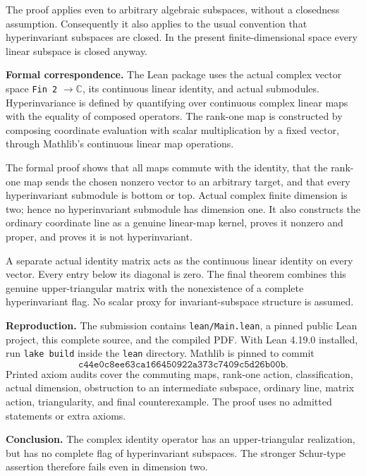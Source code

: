 \documentclass[11pt]{article}
\begin{document}
The proof applies even to arbitrary algebraic subspaces, without a closedness assumption. Consequently it also applies to the usual convention that hyperinvariant subspaces are closed. In the present finite-dimensional space every linear subspace is closed anyway.

\textbf{Formal correspondence.}
The Lean package uses the actual complex vector space \texttt{Fin 2} $\to\mathbb C$, its continuous linear identity, and actual submodules. Hyperinvariance is defined by quantifying over continuous complex linear maps with the equality of composed operators. The rank-one map is constructed by composing coordinate evaluation with scalar multiplication by a fixed vector, through Mathlib's continuous linear map operations.

The formal proof shows that all maps commute with the identity, that the rank-one map sends the chosen nonzero vector to an arbitrary target, and that every hyperinvariant submodule is bottom or top. Actual complex finite dimension is two; hence no hyperinvariant submodule has dimension one. It also constructs the ordinary coordinate line as a genuine linear-map kernel, proves it nonzero and proper, and proves it is not hyperinvariant.

A separate actual identity matrix acts as the continuous linear identity on every vector. Every entry below its diagonal is zero. The final theorem combines this genuine upper-triangular matrix with the nonexistence of a complete hyperinvariant flag. No scalar proxy for invariant-subspace structure is assumed.

\textbf{Reproduction.}
The submission contains \texttt{lean/Main.lean}, a pinned public Lean project, this complete source, and the compiled PDF. With Lean 4.19.0 installed, run \texttt{lake build} inside the \texttt{lean} directory. Mathlib is pinned to commit
\[
\texttt{c44e0c8ee63ca166450922a373c7409c5d26b00b}.
\]
Printed axiom audits cover the commuting maps, rank-one action, classification, actual dimension, obstruction to an intermediate subspace, ordinary line, matrix action, triangularity, and final counterexample. The proof uses no admitted statements or extra axioms.

\textbf{Conclusion.}
The complex identity operator has an upper-triangular realization, but has no complete flag of hyperinvariant subspaces. The stronger Schur-type assertion therefore fails even in dimension two.
\end{document}
